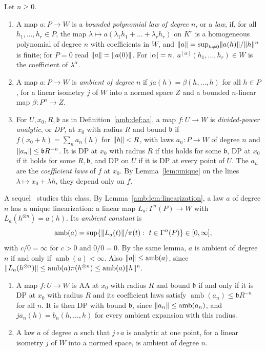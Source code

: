 \begin{definition}\label{amb:def:law}
Let $n\ge0$.
\begin{enumerate}
\item A map $a\colon P\to W$ is a \emph{bounded polynomial law of degree $n$}, or a \emph{law}, if, for all $h_1,\dots,h_r\in P$, the map $\lambda\mapsto a(\lambda_1h_1+\dots+\lambda_rh_r)$ on $K^r$ is a homogeneous polynomial of degree $n$ with coefficients in $W$, and $\lVert a\rVert=\sup_{h\ne0}\lVert a(h)\rVert/\lVert h\rVert^n$ is finite; for $P=0$ read $\lVert a\rVert=\lVert a(0)\rVert$. For $\lvert \alpha\rvert=n$, $a^{[\alpha]}(h_1,\dots,h_r)\in W$ is the coefficient of $\lambda^\alpha$.
\item A map $a\colon P\to W$ is \emph{ambient of degree $n$} if $ja(h)=\beta(h,\dots,h)$ for all $h\in P$, for a linear isometry $j$ of $W$ into a normed space $Z$ and a bounded $n$-linear map $\beta\colon P^n\to Z$.
\item For $U,x_0,R,\mathfrak b$ as in Definition~\ref{amb:def:aa}, a map $f\colon U\to W$ is \emph{divided-power analytic}, or \emph{DP}, at $x_0$ with radius $R$ and bound $\mathfrak b$ if $f(x_0+h)=\sum_na_n(h)$ for $\lVert h\rVert<R$, with laws $a_n\colon P\to W$ of degree $n$ and $\lVert a_n\rVert\le \mathfrak bR^{-n}$. It is DP at $x_0$ with radius $R$ if this holds for some $\mathfrak b$, DP at $x_0$ if it holds for some $R,\mathfrak b$, and DP on $U$ if it is DP at every point of $U$. The $a_n$ are the \emph{coefficient laws} of $f$ at $x_0$. By Lemma~\ref{lem:unique} on the lines $\lambda\mapsto x_0+\lambda h$, they depend only on $f$.
\end{enumerate}
\end{definition}

A sequel~\cite{II} studies this class. By Lemma~\ref{amb:lem:linearization}, a law $a$ of degree $n$ has a unique linearization: a linear map $L_a\colon\Gamma^n(P)\to W$ with $L_a(h^{\otimes n})=a(h)$. Its \emph{ambient constant} is
\[
 \operatorname{amb}(a)=\sup\{\norm{L_a(t)}/\pi(t):\ t\in\Gamma^n(P)\}\in[0,\infty],
\]
with $c/0=\infty$ for $c>0$ and $0/0=0$. By the same lemma, $a$ is ambient of degree $n$ if and only if $\operatorname{amb}(a)<\infty$. Also $\lVert a\rVert\le\operatorname{amb}(a)$, since $\lVert L_a(h^{\otimes n})\rVert\le\operatorname{amb}(a)\pi(h^{\otimes n})\le\operatorname{amb}(a)\lVert h\rVert^n$.

\begin{proposition}\label{amb:prop:criterion}
\leavevmode
\begin{enumerate}
\item A map $f\colon U\to W$ is AA at $x_0$ with radius $R$ and bound $\mathfrak b$ if and only if it is DP at $x_0$ with radius $R$ and its coefficient laws satisfy $\operatorname{amb}(a_n)\le \mathfrak bR^{-n}$ for all $n$. It is then DP with bound $\mathfrak b$, since $\lVert a_n\rVert\le\operatorname{amb}(a_n)$, and $ja_n(h)=b_n(h,\dots,h)$ for every ambient expansion with this radius.
\item A law $a$ of degree $n$ such that $j\circ a$ is analytic at one point, for a linear isometry $j$ of $W$ into a normed space, is ambient of degree $n$.
\end{enumerate}
\end{proposition}

